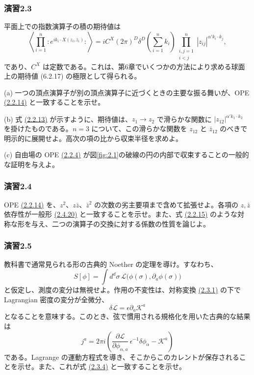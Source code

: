 \medskip
\subsubsection*{演習2.3}\label{ex:2.3}
平面上での指数演算子の積の期待値は
\[
\left\langle\prod_{i=1}^n:e^{ik_i\cdot X(z_i,\bar z_i)}:\right\rangle
=iC^X(2\pi)^D\delta^D\left(\sum_{i=1}^n k_i\right)
\prod_{\substack{i,j=1\\i<j}}^n|z_{ij}|^{\alpha'k_i\cdot k_j},
\]
であり、$C^X$ は定数である。これは、第6章でいくつかの方法により求める球面上の期待値 (6.2.17) の極限として得られる。

\noindent
(a) 一つの頂点演算子が別の頂点演算子に近づくときの主要な振る舞いが、OPE \hyperref[eq:2.2.14]{(2.2.14)} と一致することを示せ。

\noindent
(b) 式 \hyperref[eq:2.2.13]{(2.2.13)} が示すように、期待値は、$z_1\to z_2$ で滑らかな関数に $|z_{12}|^{\alpha'k_1\cdot k_2}$ を掛けたものである。$n=3$ について、この滑らかな関数を $z_{12}$ と $\bar z_{12}$ のべきで明示的に展開せよ。高次の項の比から収束半径を求めよ。

\noindent
(c) 自由場の OPE \hyperref[eq:2.2.4]{(2.2.4)} が図\ref{fig:2.1}の破線の円の内部で収束することの一般的な証明を与えよ。

\medskip
\subsubsection*{演習2.4}\label{ex:2.4}
OPE \hyperref[eq:2.2.14]{(2.2.14)} を、$z^2$、$z\bar z$、$\bar z^2$ の次数の劣主要項まで含めて拡張せよ。各項の $z,\bar z$ 依存性が一般形 \hyperref[eq:2.4.20]{(2.4.20)} と一致することを示せ。また、式 \hyperref[eq:2.2.15]{(2.2.15)} のような対称な形を与え、二つの演算子の交換に対する係数の性質を論じよ。

\medskip
\subsubsection*{演習2.5}\label{ex:2.5}
教科書で通常見られる形の古典的 Noether の定理を導け。すなわち、
\[
S[\phi]=\int d^d\sigma\,
\mathcal L\bigl(\phi(\sigma),\partial_a\phi(\sigma)\bigr)
\]
と仮定し、測度の変分は無視せよ。作用の不変性は、対称変換 \hyperref[eq:2.3.1]{(2.3.1)} の下で Lagrangian 密度の変分が全微分、
\[
\delta\mathcal L=\epsilon\partial_a\mathcal K^a
\]
となることを意味する。このとき、弦で慣用される規格化を用いた古典的な結果は
\[
j^a=2\pi i\left(
\frac{\partial\mathcal L}{\partial\phi_{\alpha,a}}\,
\epsilon^{-1}\delta\phi_\alpha-\mathcal K^a\right)
\]
である。Lagrange の運動方程式を導き、そこからこのカレントが保存されることを示せ。また、これが式 \hyperref[eq:2.3.4]{(2.3.4)} と一致することを示せ。

